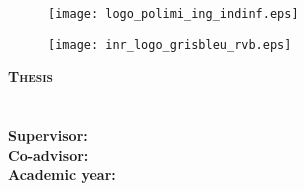 

\AddToShipoutPicture{\BackgroundPic}
\begin{figure}
    \begin{minipage}{0.4\textwidth}
    \hspace{-0.6cm}\texttt{[image: logo\_polimi\_ing\_indinf.eps]}
    \end{minipage}
    \begin{minipage}{0.5\textwidth}
        \texttt{[image: inr\_logo\_grisbleu\_rvb.eps]}
    \end{minipage}
\end{figure}

\vspace{-1mm}

\fontsize{0.3cm}{0.5cm}\selectfont \bfseries \textsc{\color{bluePoli} Thesis}\\

\vspace{-0.2cm}
\Large{\textbf{\color{bluePoli}{\title}}}\\

\vspace{-0.2cm}
\fontsize{0.3cm}{0.5cm}\selectfont \bfseries \textsc{\color{bluePoli} \course}\\



\vspace{-0.4cm}
\fontsize{0.3cm}{0.5cm}\selectfont \bfseries Supervisor: \textsc{\textbf{\advisor}}\\

\vspace{-0.4cm}
\fontsize{0.3cm}{0.5cm}\selectfont \bfseries Co-advisor: \textsc{\textbf{\firstcoadvisor}}\\

\vspace{-0.4cm}
\fontsize{0.3cm}{0.5cm}\selectfont \bfseries Academic year: \textsc{\textbf{\YEAR}}

\small \normalfont

\vspace{11pt}

